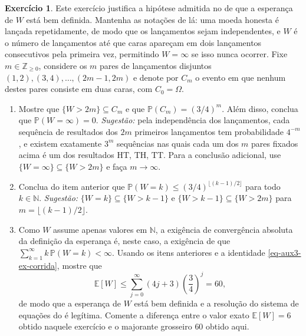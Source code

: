 \documentclass[12pt,portuguese]{article}
\theoremstyle{definition}
\newtheorem{exercise}{Exercício}
\begin{document}
\begin{exercise}\label{exercise:duas-caras-bem-definida}
Este exercício justifica a hipótese admitida no
 de que a esperança de \(W\) está bem
definida. Mantenha as notações de lá: uma moeda honesta é lançada
repetidamente, de modo que os lançamentos sejam independentes, e \(W\) é o
número de lançamentos até que caras apareçam em dois lançamentos consecutivos
pela primeira vez, permitindo \(W=\infty\) se isso nunca ocorrer. Fixe
\(m \in \mathbb{Z}_{\geqslant 0}\), considere os \(m\) pares de
lançamentos disjuntos \((1,2), (3,4), \ldots, (2m-1, 2m)\) e denote por
\(C_m\) o evento em que nenhum destes pares consiste em duas caras, com
\(C_0=\Omega\).
\begin{enumerate}[label=(\alph*)]
  \item Mostre que \(\{W > 2m\} \subseteq C_m\) e que
        \(\mathbb{P}(C_m) = (3/4)^m\).
        Além disso, conclua que \(\mathbb{P}(W=\infty)=0\).
        \emph{Sugestão:} pela independência dos lançamentos, cada sequência de
        resultados dos \(2m\) primeiros lançamentos tem probabilidade
        \(4^{-m}\), e existem exatamente \(3^m\) sequências nas quais cada um
        dos \(m\) pares fixados acima é um dos resultados
        \(\mathrm{HT}\), \(\mathrm{TH}\), \(\mathrm{TT}\). Para a conclusão
        adicional, use \(\{W=\infty\}\subseteq\{W>2m\}\) e faça
        \(m\to\infty\).
  \item Conclua do item anterior que
        \(\mathbb{P}(W = k) \leqslant (3/4)^{\lfloor (k-1)/2 \rfloor}\)
        para todo \(k \in \mathbb{N}\).
        \emph{Sugestão:} \(\{W = k\} \subseteq \{W > k-1\}\) e
        \(\{W > k-1\} \subseteq \{W > 2m\}\) para
        \(m = \lfloor (k-1)/2 \rfloor\).
  \item Como \(W\) assume apenas valores em \(\mathbb{N}\), a exigência de
        convergência absoluta da definição da esperança é, neste caso, a
        exigência de que \(\sum_{k=1}^{\infty} k\,\mathbb{P}(W = k) < \infty\).
        Usando os itens anteriores e a identidade
        \eqref{eq-aux3-ex-corrida}, mostre que
        \[
        \mathbb{E}[W] \leqslant \sum_{j=0}^{\infty} (4j+3)\left(\frac{3}{4}\right)^{j}
        = 60,
        \]
        de modo que a esperança de \(W\) está bem definida e a resolução do
        sistema de equações do  é
        legítima. Comente a diferença entre o valor exato \(\mathbb{E}[W] = 6\)
        obtido naquele exercício e o majorante grosseiro \(60\) obtido aqui.
\end{enumerate}
\end{exercise}
\end{document}

